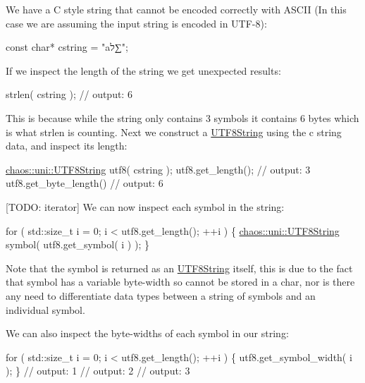 We have a C style string that cannot be encoded correctly with A\+S\+C\+I\+I (In this case we are assuming the input string is encoded in U\+T\+F-\/8)\+:


\begin{DoxyCode}
\textcolor{keyword}{const} \textcolor{keywordtype}{char}* cstring = \textcolor{stringliteral}{"aל∑"};
\end{DoxyCode}


If we inspect the length of the string we get unexpected results\+:


\begin{DoxyCode}
strlen( cstring );
\textcolor{comment}{// output: 6}
\end{DoxyCode}


This is because while the string only contains 3 symbols it contains 6 bytes which is what {\ttfamily strlen} is counting. Next we construct a \hyperlink{classchaos_1_1uni_1_1_u_t_f8_string}{U\+T\+F8\+String} using the c string data, and inspect it\textquotesingle{}s length\+:


\begin{DoxyCode}
\hyperlink{classchaos_1_1uni_1_1_u_t_f8_string}{chaos::uni::UTF8String} utf8( cstring );
utf8.get\_length();
\textcolor{comment}{// output: 3}
utf8.get\_byte\_length()
\textcolor{comment}{// output: 6}
\end{DoxyCode}


\mbox{[}T\+O\+D\+O\+: iterator\mbox{]} We can now inspect each symbol in the string\+:


\begin{DoxyCode}
\textcolor{keywordflow}{for} ( std::size\_t i = 0; i < utf8.get\_length(); ++i )
\{
    \hyperlink{classchaos_1_1uni_1_1_u_t_f8_string}{chaos::uni::UTF8String} symbol( utf8.get\_symbol( i ) );
\}
\end{DoxyCode}


Note that the symbol is returned as an \hyperlink{classchaos_1_1uni_1_1_u_t_f8_string}{U\+T\+F8\+String} itself, this is due to the fact that symbol has a variable byte-\/width so cannot be stored in a {\ttfamily char}, nor is there any need to differentiate data types between a string of symbols and an individual symbol.

We can also inspect the byte-\/widths of each symbol in our string\+:


\begin{DoxyCode}
\textcolor{keywordflow}{for} ( std::size\_t i = 0; i < utf8.get\_length(); ++i )
\{
    utf8.get\_symbol\_width( i );
\}
\textcolor{comment}{// output: 1}
\textcolor{comment}{// output: 2}
\textcolor{comment}{// output: 3}
\end{DoxyCode}


